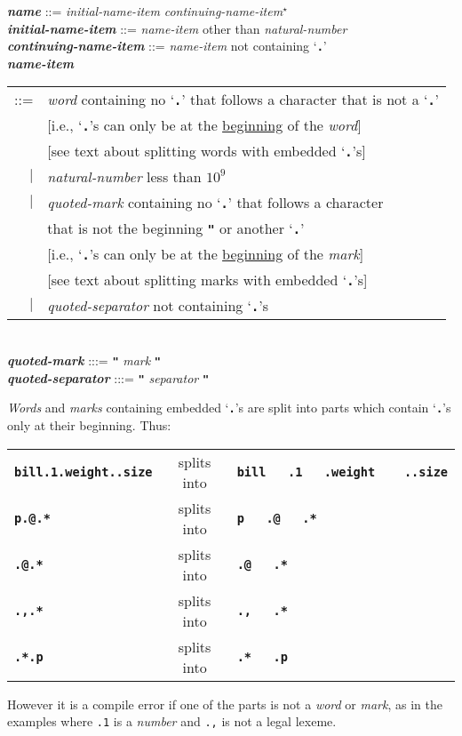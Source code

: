 \documentclass[12pt]{article}
\newcommand{\TT}[1]{{\tt \bfseries #1}}
\newcommand{\STAR}{{\Large $^\star$}}
\newcommand{\emkey}[1]{{\em \bfseries #1}}
\newenvironment{indpar}[1][0.3in]%
	{\begin{list}{}%
		     {\setlength{\itemsep}{0in}%
		      \setlength{\topsep}{0in}%
		      \setlength{\parsep}{1ex}%
		      \setlength{\labelwidth}{#1}%
		      \setlength{\leftmargin}{#1}%
		      \addtolength{\leftmargin}{\labelsep}}%
	 \item}%
	{\end{list}}
\begin{document}
\begin{indpar}
\emkey{name}\label{NAME} ::=
    {\em initial-name-item} {\em continuing-name-item}\STAR{} \\
\emkey{initial-name-item} ::= {\em name-item} other than {\em natural-number} \\
\emkey{continuing-name-item} ::= {\em name-item} not containing `\TT{.}' \\
\emkey{name-item}\label{NAME-ITEM}
    \begin{tabular}[t]{@{}rl}
    ::= & {\em word} containing no `\TT{.}' that follows a character
                     that is not a `\TT{.}' \\
        & [i.e., `\TT{.}'s can only be at the \underline{beginning}
	   of the {\em word}] \\
        & [see text about splitting words with embedded `\TT{.}'s] \\
    $|$ & {\em natural-number} less than $10^9$ \\
    $|$ & {\em quoted-mark} containing no `\TT{.}' that follows a character \\
        & that is not the beginning \TT{"} or another `\TT{.}' \\
        & [i.e., `\TT{.}'s can only be at the \underline{beginning}
	   of the {\em mark}] \\
        & [see text about splitting marks with embedded `\TT{.}'s] \\
    $|$ & {\em quoted-separator} not containing `\TT{.}'s \\
    \end{tabular} \\
\emkey{quoted-mark} :::= \TT{"} {\em mark} \TT{"} \\
\emkey{quoted-separator} :::= \TT{"} {\em separator} \TT{"}
\end{indpar}

{\em Words} and {\em marks} containing embedded `\TT{.}'s are split into
parts which contain `\TT{.}'s only at their beginning.
Thus:
\begin{center}
\begin{tabular}{lcl}
\TT{bill.1.weight..size} & splits into & \TT{bill~~~.1~~~.weight~~~~..size} \\
\TT{p.@.*}               & splits into & \TT{p~~~.@~~~.*} \\
\TT{.@.*}               & splits into & \TT{.@~~~.*} \\
\TT{.,.*}               & splits into & \TT{.,~~~.*} \\
\TT{.*.p}               & splits into & \TT{.*~~~.p} \\
\end{tabular}
\end{center}
However it is a compile error if one of the parts is not a {\em word}
or {\em mark}, as in the examples where {\tt .1} is a {\em number} and
{\tt .,} is not a legal lexeme.
\end{document}
